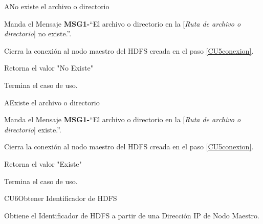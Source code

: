 
\begin{UCtrayectoriaA}{A}{No existe el archivo o directorio}

	\UCpaso Manda el Mensaje {\bf MSG1-}``El archivo o directorio en la [{\em Ruta de archivo o directorio}] no existe.''.

	\UCpaso[\UCsist] Cierra la conexión al nodo maestro del HDFS creada en el paso \ref{CU5conexion}.

	\UCpaso[\UCsist] Retorna el valor "No Existe"

	\UCpaso[] Termina el caso de uso.

\end{UCtrayectoriaA}



\begin{UCtrayectoriaA}{A}{Existe el archivo o directorio}

	\UCpaso Manda el Mensaje {\bf MSG1-}``El archivo o directorio en la [{\em Ruta de archivo o directorio}] existe.''.

	\UCpaso[\UCsist] Cierra la conexión al nodo maestro del HDFS creada en el paso \ref{CU5conexion}.

	\UCpaso[\UCsist] Retorna el valor "Existe"

	\UCpaso[] Termina el caso de uso.

\end{UCtrayectoriaA}




\begin{UseCase}{CU6}{Obtener Identificador de HDFS}{

Obtiene el Identificador de HDFS a partir de una Dirección IP de Nodo Maestro.

}















\end{UseCase}


